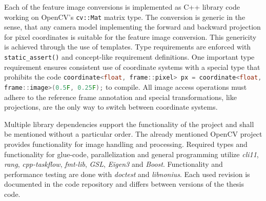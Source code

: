 Each of the feature image conversions is implemented as C++ library code working on OpenCV's\cite{opencv_library} \lstinline[basicstyle=\ttfamily]|cv::Mat| matrix type.
The conversion is generic in the sense, that any camera model implementing the forward and backward projection for pixel coordinates is suitable for the feature image conversion.
This genericity is achieved through the use of templates.
Type requirements are enforced with \lstinline[basicstyle=\ttfamily]|static_assert()| and concept-like\cite{c++concepts} requirement definitions.
One important type requirement ensures consistent use of coordinate systems with a special type that prohibits the code \texttt{\lstinline[language=C++,basicstyle=\footnotesize\ttfamily]|coordinate<float, frame::pixel> px = coordinate<float, frame::image>(0.5F, 0.25F);|} to compile.
All image access operations must adhere to the reference frame annotation and special transformations, like projections, are the only way to switch between coordinate systems.

Multiple library dependencies support the functionality of the project and shall be mentioned without a particular order.
The already mentioned OpenCV\cite{opencv_library} project provides functionality for image handling and processing. 
Required types and functionality for glue-code, parallelization and general programming utilize \emph{cli11}\cite{cli11}, \emph{rang}\cite{rang}, \emph{cpp-taskflow}\cite{Huang2019CppTaskflowFT}, \emph{fmt-lib}\cite{fmtlib}, \emph{GSL}\cite{gsl}, \emph{Eigen3}\cite{eigenweb} and \emph{Boost}\cite{boost}.
Functionality and performance testing are done with \emph{doctest}\cite{doctest} and \emph{libnonius}\cite{libnonius}.
Each used revision is documented in the code repository and differs between versions of the thesis code.
